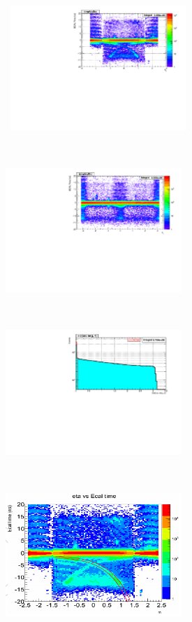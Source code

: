 \begin{center}
\centering
\mbox{
\includegraphics[height=6cm, width=0.5\textwidth]{THESISPLOTS/SinglePhotonDataSet-TimeVsEta.pdf}
\includegraphics[height=6cm, width=0.5\textwidth]{THESISPLOTS/SinglePhotonDataSet-TimeVsPhi.pdf}}
\mbox{
\includegraphics[height=6cm, width=0.5\textwidth]{THESISPLOTS/CSC-Segment-Halo-Tagging.pdf}
\includegraphics[height=6cm, width=0.5\textwidth]{THESISPLOTS/HALO-ECAL-TIME-Vs-ETA.png}}
\label{fig:HALO}
\end{center} 



